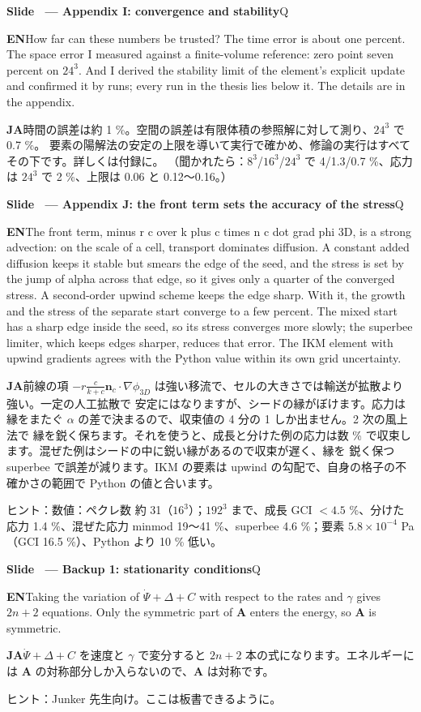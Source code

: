 \documentclass[11pt,a4paper]{article}
\newcounter{sl}
\newcommand{\slide}[2]{\stepcounter{sl}\vspace{8pt}%
  {\color{c3}\large\bfseries Slide \thesl\ --- #1}\hfill{\small #2}\par\vspace{2pt}}
\newcommand{\EN}{\textbf{EN}\quad}
\newcommand{\JA}{\par\textbf{JA}\quad}
\newcommand{\hint}[1]{\par{\color{gray}\small ヒント：#1}}
\begin{document}
\slide{Appendix I: convergence and stability}{Q}
\EN How far can these numbers be trusted? The time error is about one percent.
The space error I measured against a finite-volume reference: zero point seven percent on $24^3$.
And I derived the stability limit of the element's explicit update and confirmed it by runs; every run in the
thesis lies below it. The details are in the appendix.
\JA 時間の誤差は約 1 \%。空間の誤差は有限体積の参照解に対して測り、$24^3$ で 0.7 \%。
要素の陽解法の安定の上限を導いて実行で確かめ、修論の実行はすべてその下です。詳しくは付録に。
（聞かれたら：$8^3$/$16^3$/$24^3$ で 4/1.3/0.7 \%、応力は $24^3$ で 2 \%、上限は 0.06 と 0.12〜0.16。）

\slide{Appendix J: the front term sets the accuracy of the stress}{Q}
\EN The front term, minus r c over k plus c times n c dot grad phi 3D, is a strong advection: on the scale of a
cell, transport dominates diffusion. A constant added diffusion keeps it stable but smears the edge of the seed,
and the stress is set by the jump of alpha across that edge, so it gives only a quarter of the converged stress.
A second-order upwind scheme keeps the edge sharp. With it, the growth and the stress of the separate start
converge to a few percent. The mixed start has a sharp edge inside the seed, so its stress converges more slowly;
the superbee limiter, which keeps edges sharper, reduces that error. The IKM element with upwind gradients agrees
with the Python value within its own grid uncertainty.
\JA 前線の項 $-r\frac{c}{k+c}\mathbf n_c\cdot\nabla\phi_{3D}$ は強い移流で、セルの大きさでは輸送が拡散より強い。一定の人工拡散で
安定にはなりますが、シードの縁がぼけます。応力は縁をまたぐ $\alpha$ の差で決まるので、収束値の 4 分の 1 しか出ません。2 次の風上法で
縁を鋭く保ちます。それを使うと、成長と分けた例の応力は数 \% で収束します。混ぜた例はシードの中に鋭い縁があるので収束が遅く、縁を
鋭く保つ superbee で誤差が減ります。IKM の要素は upwind の勾配で、自身の格子の不確かさの範囲で Python の値と合います。
\hint{数値：ペクレ数 約 31（$16^3$）；$192^3$ まで、成長 GCI $<4.5$ \%、分けた応力 1.4 \%、混ぜた応力 minmod 19〜41 \%、superbee 4.6 \%；要素 $5.8\times10^{-4}$ Pa（GCI 16.5 \%）、Python より 10 \% 低い。}

\slide{Backup 1: stationarity conditions}{Q}
\EN Taking the variation of $\dot\Psi+\Delta+C$ with respect to the rates and $\gamma$ gives $2n+2$ equations. Only the symmetric part of $\mathbf A$ enters the energy, so $\mathbf A$ is symmetric.
\JA $\dot\Psi+\Delta+C$ を速度と $\gamma$ で変分すると $2n+2$ 本の式になります。エネルギーには $\mathbf A$ の対称部分しか入らないので、$\mathbf A$ は対称です。
\hint{Junker 先生向け。ここは板書できるように。}
\end{document}
